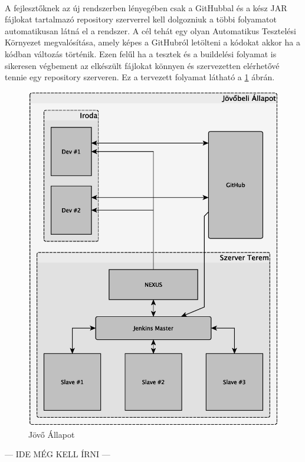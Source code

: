 \paragraph{}
A fejlesztőknek az új rendszerben lényegében csak a GitHubbal és a kész JAR fájlokat tartalmazó repository szerverrel kell dolgozniuk a többi folyamatot automatikusan látná el a rendszer. 
A cél tehát egy olyan Automatikus Tesztelési Környezet megvalósítása, amely képes a GitHubról letölteni a kódokat akkor ha a kódban változás történik. 
Ezen felűl ha a tesztek és a buildelési folyamat is sikeresen végbement az elkészült fájlokat könnyen és szervezetten elérhetővé tennie egy repository szerveren. 
Ez a tervezett folyamat látható a \ref{fig:jovoallapot} ábrán. 


\begin{figure}[h]
	\centering
	\includegraphics[width=0.7\linewidth]{figures/jovoallapot}
	\caption{Jövő Állapot}
	\label{fig:jovoallapot}
\end{figure}

--- IDE MÉG KELL ÍRNI ---
